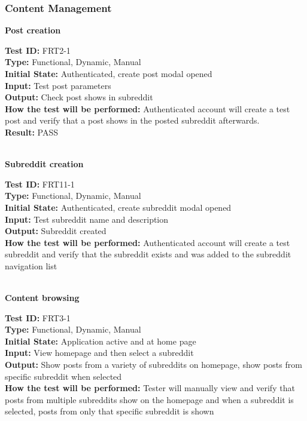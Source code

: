 \documentclass[12pt,fleqn]{article}
\begin{document}
\subsubsection{Content Management}

\textbf{Post creation}
\begin{tcolorbox}
\textbf{Test ID:} FRT2-1\\
\textbf{Type:} Functional, Dynamic, Manual\\
\textbf{Initial State:} Authenticated, create post modal opened\\
\textbf{Input:} Test post parameters\\
\textbf{Output:} Check post shows in subreddit\\
\textbf{How the test will be performed:} Authenticated account will create a test post and verify that a post shows in the posted subreddit afterwards. \\
\textbf{Result: } PASS 
\end{tcolorbox}

\textbf{\\Subreddit creation}
\begin{tcolorbox}
\textbf{Test ID:} FRT11-1\\ %
\textbf{Type:} Functional, Dynamic, Manual\\
\textbf{Initial State:} Authenticated, create subreddit modal opened\\
\textbf{Input:} Test subreddit name and description\\
\textbf{Output:} Subreddit created\\
\textbf{How the test will be performed:} Authenticated account will create a test subreddit and verify that the subreddit exists and was added to the subreddit navigation list
\end{tcolorbox}

\newpage

\textbf{\\Content browsing}
\begin{tcolorbox}
\textbf{Test ID:} FRT3-1\\
\textbf{Type:} Functional, Dynamic, Manual\\
\textbf{Initial State:} Application active and at home page\\
\textbf{Input:} View homepage and then select a subreddit\\
\textbf{Output:} Show posts from a variety of subreddits on homepage, show posts from specific subreddit when selected\\
\textbf{How the test will be performed:} Tester will manually view and verify that posts from multiple subreddits show on the homepage and when a subreddit is selected, posts from only that specific subreddit is shown
\end{tcolorbox}
\end{document}
